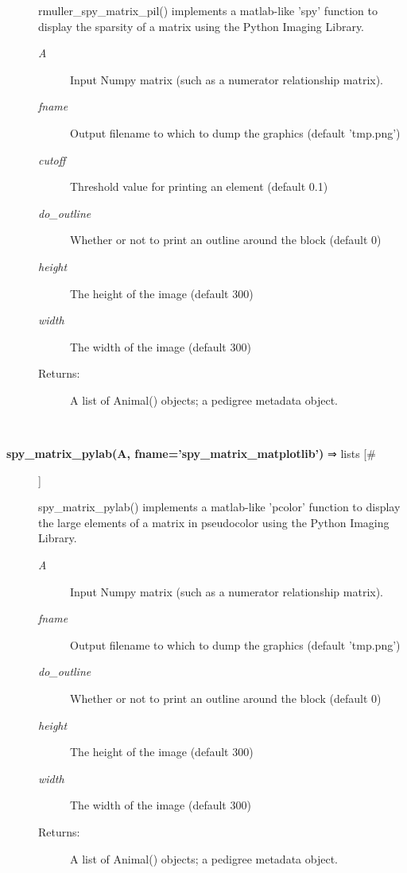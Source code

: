 \documentclass[10pt]{article}
\begin{document}
\begin{description}
 rmuller\_spy\_matrix\_pil() implements a matlab-like 'spy' function to display the sparsity of a matrix using the Python Imaging Library.
\begin{description}
\item[\emph{A}
] Input Numpy matrix (such as a numerator relationship matrix).
\item[\emph{fname}
] Output filename to which to dump the graphics (default 'tmp.png')
\item[\emph{cutoff}
] Threshold value for printing an element (default 0.1)
\item[\emph{do\_outline}
] Whether or not to print an outline around the block (default 0)
\item[\emph{height}
] The height of the image (default 300)
\item[\emph{width}
] The width of the image (default 300)
\item[Returns:] A list of Animal() objects; a pedigree metadata object.

\end{description}
\\ 

\item[\textbf{spy\_matrix\_pylab(A, fname='spy\_matrix\_matplotlib')}
 ⇒ lists [\#]]

 spy\_matrix\_pylab() implements a matlab-like 'pcolor' function to display the large elements of a matrix in pseudocolor using the Python Imaging Library.
\begin{description}
\item[\emph{A}
] Input Numpy matrix (such as a numerator relationship matrix).
\item[\emph{fname}
] Output filename to which to dump the graphics (default 'tmp.png')
\item[\emph{do\_outline}
] Whether or not to print an outline around the block (default 0)
\item[\emph{height}
] The height of the image (default 300)
\item[\emph{width}
] The width of the image (default 300)
\item[Returns:] A list of Animal() objects; a pedigree metadata object.

\end{description}
\\ 


\end{description}
\end{document}
